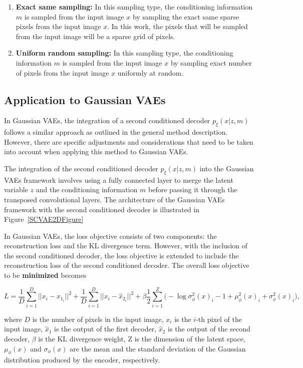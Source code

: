 \begin{enumerate}
    \item \textbf{Exact same sampling:} In this sampling type, the conditioning information $m$ is sampled from the input image $x$ by sampling the exact same sparse pixels from the input image $x$. In this work, the pixels that will be sampled from the input image will be a sparse grid of pixels.
    \item \textbf{Uniform random sampling:} In this sampling type, the conditioning information $m$ is sampled from the input image $x$ by sampling exact number of pixels from the input image $x$ uniformly at random.
\end{enumerate}

\subsection{Application to Gaussian VAEs}

In Gaussian VAEs, the integration of a second conditioned decoder
$p_\xi(x|z,m)$ follows a similar approach as outlined in the general method
description. However, there are specific adjustments and considerations that
need to be taken into account when applying this method to Gaussian VAEs.

The integration of the second conditioned decoder $p_\xi(x|z,m)$ into the
Gaussian VAEs framework involves using a fully connected layer to merge the
latent variable $z$ and the conditioning information $m$ before passing it
through the transposed convolutional layers. The architecture of the Gaussian
VAEs framework with the second conditioned decoder is illustrated in
Figure~\ref{SCVAE2DFigure}

In Gaussian VAEs, the loss objective consists of two components: the
reconstruction loss and the KL divergence term. However, with the inclusion of
the second conditioned decoder, the loss objective is extended to include the
reconstruction loss of the second conditioned decoder. The overall loss
objective to be \textbf{minimized} becomes

\[ L = \frac{1}{D} \sum_{i=1}^{D} ||x_i - \hat{x}_{1_{i}} ||^2 + \frac{1}{D} \sum_{i=1}^{D} || x_i - \hat{x}_{2_{i}} ||^2 + \beta  \frac{1}{2} \sum_{i=1}^{Z} \biggl( -\log \sigma^2_\phi(x)_i - 1 + \mu^2_\phi(x)_i + \sigma^2_\phi(x)_i \biggr), \]

where $D$ is the number of pixels in the input image, $x_i$ is the $i$-th pixel
of the input image, $\hat{x}_1$ is the output of the first decoder, $\hat{x}_2$
is the output of the second decoder, $\beta$ is the KL divergence weight, Z is the dimension of the latent space,
$\mu_\phi(x)$ and $\sigma_\phi(x)$ are the mean and the standard deviation of
the Gaussian distribution produced by the encoder, respectively.

